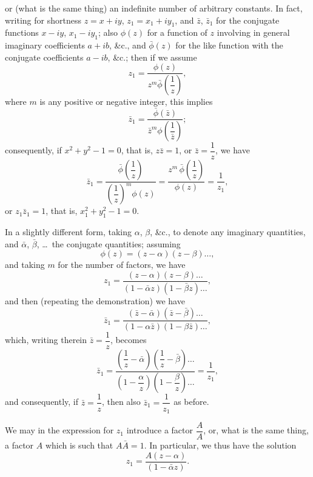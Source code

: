 \documentclass[11pt,a4paper]{article}
\begin{document}
or (what is the same thing) an indefinite number of arbitrary constants. In fact, writing for shortness $z = x + iy$, $z_1 = x_1 + i y_1$, and $\bar{z}$, $\bar{z}_1$ for the conjugate functions $x - iy$, $x_1 - i y_1$; also $\phi(z)$ for a function of $z$ involving in general imaginary coefficients $a + ib$, \&c., and $\bar{\phi}(z)$ for the like function with the conjugate coefficients $a - ib$, \&c.; then if we assume
\[
z_1 = \frac{\phi(z)}{z^m\bar{\phi}\!\left(\dfrac{1}{z}\right)},
\]
where $m$ is any positive or negative integer, this implies
\[
\bar{z}_1 = \frac{\bar{\phi}(\bar{z})}{\bar{z}^m\phi\!\left(\dfrac{1}{\bar{z}}\right)};
\]
consequently, if $x^2 + y^2 - 1 = 0$, that is, $z\bar{z} = 1$, or $\bar{z} = \dfrac{1}{z}$, we have
\[
\bar{z}_1 = \frac{\bar{\phi}\!\left(\dfrac{1}{z}\right)}{\left(\dfrac{1}{z}\right)^m \phi(z)} = \frac{z^m\,\bar{\phi}\!\left(\dfrac{1}{z}\right)}{\phi(z)} = \frac{1}{z_1},
\]
or $z_1 \bar{z}_1 = 1$, that is, $x_1^2 + y_1^2 - 1 = 0$.

In a slightly different form, taking $\alpha$, $\beta$, \&c., to denote any imaginary quantities, and $\bar{\alpha}$, $\bar{\beta}$, \ldots\ the conjugate quantities; assuming
\[
\phi(z) = (z - \alpha)(z - \beta)\ldots,
\]
and taking $m$ for the number of factors, we have
\[
z_1 = \frac{(z - \alpha)(z - \beta)\ldots}{(1 - \bar{\alpha}z)(1 - \bar{\beta}z)\ldots},
\]
and then (repeating the demonstration) we have
\[
\bar{z}_1 = \frac{(\bar{z} - \bar{\alpha})(\bar{z} - \bar{\beta})\ldots}{(1 - \alpha \bar{z})(1 - \beta \bar{z})\ldots},
\]
which, writing therein $\bar{z} = \dfrac{1}{z}$, becomes
\[
\bar{z}_1 = \frac{\left(\dfrac{1}{z} - \bar{\alpha}\right)\!\left(\dfrac{1}{z} - \bar{\beta}\right)\ldots}{\left(1 - \dfrac{\alpha}{z}\right)\!\left(1 - \dfrac{\beta}{z}\right)\ldots} = \frac{1}{z_1},
\]
and consequently, if $\bar{z} = \dfrac{1}{z}$, then also $\bar{z}_1 = \dfrac{1}{z_1}$ as before.

We may in the expression for $z_1$ introduce a factor $\dfrac{A}{A}$, or, what is the same thing, a factor $A$ which is such that $A\bar{A} = 1$. In particular, we thus have the solution
\[
z_1 = \frac{A(z - \alpha)}{(1 - \bar{\alpha}z)}.
\]
\end{document}

